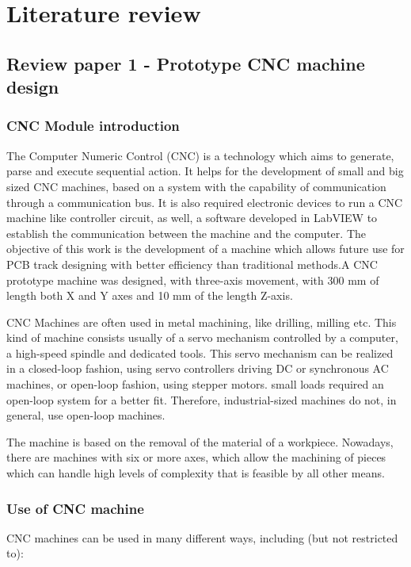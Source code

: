 \chapter{Literature review} \label{chapter2}

\section{Review paper 1 - Prototype CNC machine design}

\subsection{CNC Module introduction}
The Computer Numeric Control (CNC) \cite{ieee_pap} is a technology which aims to generate, parse and execute sequential action. It helps for the development of small and big sized CNC machines, based on a system with the capability of communication through a communication bus. It is also required electronic devices to run a CNC machine like controller circuit, as well, a software developed in LabVIEW to establish the communication between the machine and the computer. The objective of this work is the development of a machine which allows future use for PCB track designing with better efficiency than traditional methods.A CNC prototype machine was designed, with three-axis movement, with 300 mm of length both X and Y axes and 10 mm of the length Z-axis. \par

CNC Machines are often used in metal machining, like drilling, milling etc. This kind of machine consists usually of a servo mechanism controlled by a computer, a high-speed spindle and dedicated tools. This servo mechanism can be realized in a closed-loop fashion, using servo controllers driving DC or synchronous AC machines, or open-loop fashion, using stepper motors. small loads required an open-loop system for a better fit. Therefore, industrial-sized machines do not, in general, use open-loop machines. \par

The machine is based on the removal of the material of a workpiece. Nowadays, there are machines with six or more axes, which allow the machining of pieces which can handle high levels of complexity that is feasible by all other means.


\subsection{Use of CNC machine}
CNC machines can be used in many different ways, including (but not restricted to):

